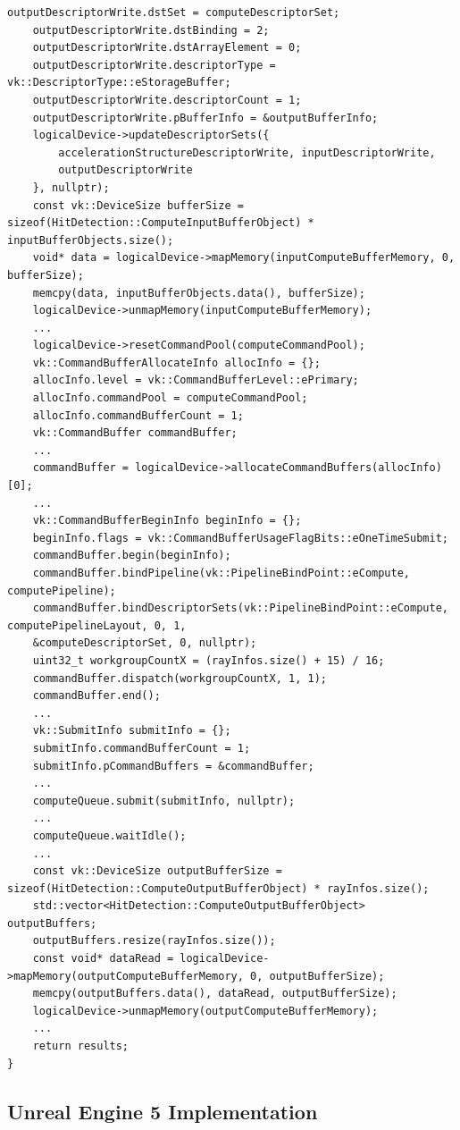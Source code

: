 \documentclass[11pt]{scrartcl}
\begin{document}
\begin{lstlisting}[caption={\textit{traceRay} Funktion in VulkanRenderer.cpp},label={lst:listing-vulkan-traceraycpp}]
	outputDescriptorWrite.dstSet = computeDescriptorSet;
	outputDescriptorWrite.dstBinding = 2;
	outputDescriptorWrite.dstArrayElement = 0;
	outputDescriptorWrite.descriptorType = vk::DescriptorType::eStorageBuffer;
	outputDescriptorWrite.descriptorCount = 1;
	outputDescriptorWrite.pBufferInfo = &outputBufferInfo;
	logicalDevice->updateDescriptorSets({
		accelerationStructureDescriptorWrite, inputDescriptorWrite,
		outputDescriptorWrite
	}, nullptr);
	const vk::DeviceSize bufferSize = sizeof(HitDetection::ComputeInputBufferObject) * inputBufferObjects.size();
	void* data = logicalDevice->mapMemory(inputComputeBufferMemory, 0, bufferSize);
	memcpy(data, inputBufferObjects.data(), bufferSize);
	logicalDevice->unmapMemory(inputComputeBufferMemory);
	...
	logicalDevice->resetCommandPool(computeCommandPool);
	vk::CommandBufferAllocateInfo allocInfo = {};
	allocInfo.level = vk::CommandBufferLevel::ePrimary;
	allocInfo.commandPool = computeCommandPool;
	allocInfo.commandBufferCount = 1;
	vk::CommandBuffer commandBuffer;
	...
	commandBuffer = logicalDevice->allocateCommandBuffers(allocInfo)[0];
	...
	vk::CommandBufferBeginInfo beginInfo = {};
	beginInfo.flags = vk::CommandBufferUsageFlagBits::eOneTimeSubmit;
	commandBuffer.begin(beginInfo);
	commandBuffer.bindPipeline(vk::PipelineBindPoint::eCompute, computePipeline);
	commandBuffer.bindDescriptorSets(vk::PipelineBindPoint::eCompute, computePipelineLayout, 0, 1,
	&computeDescriptorSet, 0, nullptr);
	uint32_t workgroupCountX = (rayInfos.size() + 15) / 16;
	commandBuffer.dispatch(workgroupCountX, 1, 1);
	commandBuffer.end();
	...
	vk::SubmitInfo submitInfo = {};
	submitInfo.commandBufferCount = 1;
	submitInfo.pCommandBuffers = &commandBuffer;
	...
	computeQueue.submit(submitInfo, nullptr);
	...
	computeQueue.waitIdle();
	...
	const vk::DeviceSize outputBufferSize = sizeof(HitDetection::ComputeOutputBufferObject) * rayInfos.size();
	std::vector<HitDetection::ComputeOutputBufferObject> outputBuffers;
	outputBuffers.resize(rayInfos.size());
	const void* dataRead = logicalDevice->mapMemory(outputComputeBufferMemory, 0, outputBufferSize);
	memcpy(outputBuffers.data(), dataRead, outputBufferSize);
	logicalDevice->unmapMemory(outputComputeBufferMemory);
	...
	return results;
}	\end{lstlisting}

	\subsection{Unreal Engine 5 Implementation}
	
\end{document}
